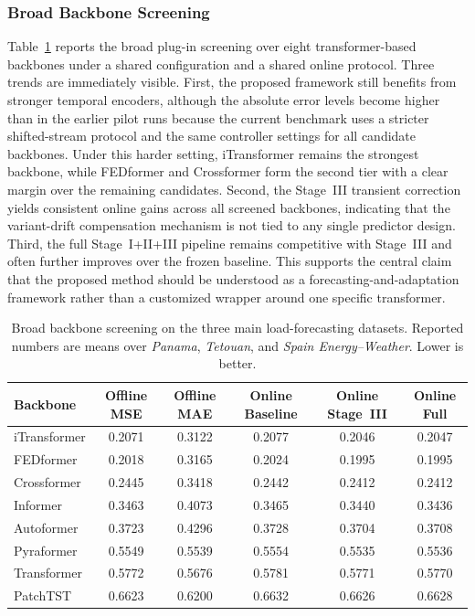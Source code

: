 ﻿\documentclass[journal]{IEEEtran}
\begin{document}
\subsubsection{Broad Backbone Screening}
Table~\ref{tab:backbone_screening} reports the broad plug-in screening over eight transformer-based backbones under a shared configuration and a shared online protocol. Three trends are immediately visible. First, the proposed framework still benefits from stronger temporal encoders, although the absolute error levels become higher than in the earlier pilot runs because the current benchmark uses a stricter shifted-stream protocol and the same controller settings for all candidate backbones. Under this harder setting, iTransformer remains the strongest backbone, while FEDformer and Crossformer form the second tier with a clear margin over the remaining candidates. Second, the Stage~III transient correction yields consistent online gains across all screened backbones, indicating that the variant-drift compensation mechanism is not tied to any single predictor design. Third, the full Stage~I+II+III pipeline remains competitive with Stage~III and often further improves over the frozen baseline. This supports the central claim that the proposed method should be understood as a forecasting-and-adaptation framework rather than a customized wrapper around one specific transformer.

\begin{table}[t]
\caption{Broad backbone screening on the three main load-forecasting datasets. Reported numbers are means over \textit{Panama}, \textit{Tetouan}, and \textit{Spain Energy--Weather}. Lower is better.}
\label{tab:backbone_screening}
\centering
\begin{tabular}{lccccc}
\toprule
Backbone & Offline MSE & Offline MAE & Online Baseline & Online Stage~III & Online Full \\
\midrule
iTransformer & 0.2071 & 0.3122 & 0.2077 & 0.2046 & 0.2047 \\
FEDformer & 0.2018 & 0.3165 & 0.2024 & 0.1995 & 0.1995 \\
Crossformer & 0.2445 & 0.3418 & 0.2442 & 0.2412 & 0.2412 \\
Informer & 0.3463 & 0.4073 & 0.3465 & 0.3440 & 0.3436 \\
Autoformer & 0.3723 & 0.4296 & 0.3728 & 0.3704 & 0.3708 \\
Pyraformer & 0.5549 & 0.5539 & 0.5554 & 0.5535 & 0.5536 \\
Transformer & 0.5772 & 0.5676 & 0.5781 & 0.5771 & 0.5770 \\
PatchTST & 0.6623 & 0.6200 & 0.6632 & 0.6626 & 0.6628 \\
\bottomrule
\end{tabular}
\end{table}
\end{document}
